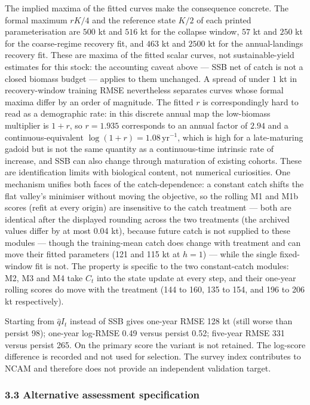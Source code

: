 \documentclass[11pt]{article}
\begin{document}
The implied maxima of the fitted curves make the consequence concrete.
The formal maximum \(rK/4\) and the reference state \(K/2\) of each
printed parameterisation are \(500\) kt and \(516\) kt for the collapse
window, \(57\) kt and \(250\) kt for the coarse-regime recovery fit, and
\(463\) kt and \(2500\) kt for the annual-landings recovery fit. These
are maxima of the fitted scalar curves, not sustainable-yield estimates
for this stock: the accounting caveat above --- SSB net of catch is not
a closed biomass budget --- applies to them unchanged. A spread of under
\(1\) kt in recovery-window training RMSE nevertheless separates curves
whose formal maxima differ by an order of magnitude. The fitted \(r\) is
correspondingly hard to read as a demographic rate: in this discrete
annual map the low-biomass multiplier is \(1+r\), so \(r = 1.935\)
corresponds to an annual factor of \(2.94\) and a continuous-equivalent
\(\log(1+r) = 1.08\,\mathrm{yr}^{-1}\), which is high for a
late-maturing gadoid but is not the same quantity as a continuous-time
intrinsic rate of increase, and SSB can also change through maturation
of existing cohorts. These are identification limits with biological
content, not numerical curiosities. One mechanism
unifies both faces of the catch-dependence: a constant catch shifts the
flat valley's minimiser without moving the objective, so the rolling
M1 and M1b scores (refit at every origin) are insensitive to the catch
treatment --- both are identical after the displayed rounding across the two
treatments (the archived values differ by at most 0.04 kt), because
future catch is not supplied to these modules --- though the
training-mean catch does change with treatment and can move their fitted
parameters (121 and 115 kt at \(h=1\)) --- while the single
fixed-window fit is not. The property is specific to the two
constant-catch modules: M2, M3 and M4 take \(C_t\) into the state
update at every step, and their one-year rolling scores do move with the
treatment (144 to 160, 135 to 154, and 196 to 206 kt respectively).

Starting from \(\hat q I_t\) instead of SSB gives one-year RMSE 128 kt
(still worse than persist 98); one-year log-RMSE 0.49 versus persist
0.52; five-year RMSE 331 versus persist 265. On the primary score the
variant is not retained. The log-score difference is recorded and not
used for selection. The survey index contributes to NCAM and therefore
does not provide an independent validation target.

\subsubsection{3.3 Alternative assessment
specification}\label{alternative-assessment-specification}
\end{document}
